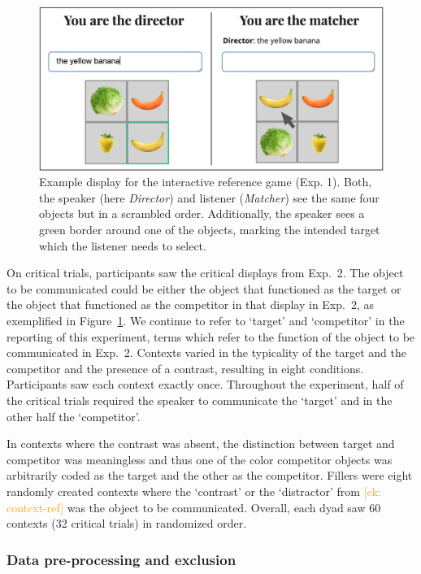 \documentclass[a4paper,man,floatsintext,natbib]{apa6}
\newcommand{\ek}[1]{\textcolor{Orange}{[ek: #1]}}
\newcommand{\figref}[1]{Figure~\ref{#1}}
\begin{document}
\begin{figure}
	\begin{center}
		\includegraphics[width=.8\textwidth]{img/production/prod-design.pdf}
	\end{center}
\caption{Example display for the interactive reference game (Exp. 1). Both, the speaker (here \textit{Director}) and listener (\textit{Matcher}) see the same four objects but in a scrambled order. Additionally, the speaker sees a green border around one of the objects, marking the intended target which the listener needs to select.} 
\label{prod-design}
\end{figure}

On critical trials, participants saw the critical displays from Exp.~2. The object to be communicated could be either the object that functioned as the target or the object that functioned as the competitor in that display in Exp.~2, as exemplified in \figref{prod-design}. We continue to refer to `target' and `competitor' in the reporting of this experiment, terms which refer to the function of the object to be communicated in Exp.~2. 
Contexts varied in the typicality of the target and the competitor and the presence of a contrast, resulting in eight conditions. Participants saw each context exactly once. 
Throughout the experiment, half of the critical trials required the speaker to communicate the `target' and in the other half the `competitor'.

In contexts where the contrast was absent, the distinction between target and competitor was meaningless and thus one of the color competitor objects was arbitrarily coded as the target and the other as the competitor. Fillers were eight randomly created contexts where the `contrast' or the `distractor' from \ek{context-ref} was the object to be communicated. Overall, each dyad saw 60 contexts (32 critical trials) in randomized order.

\subsubsection{Data pre-processing and exclusion}
\end{document}
